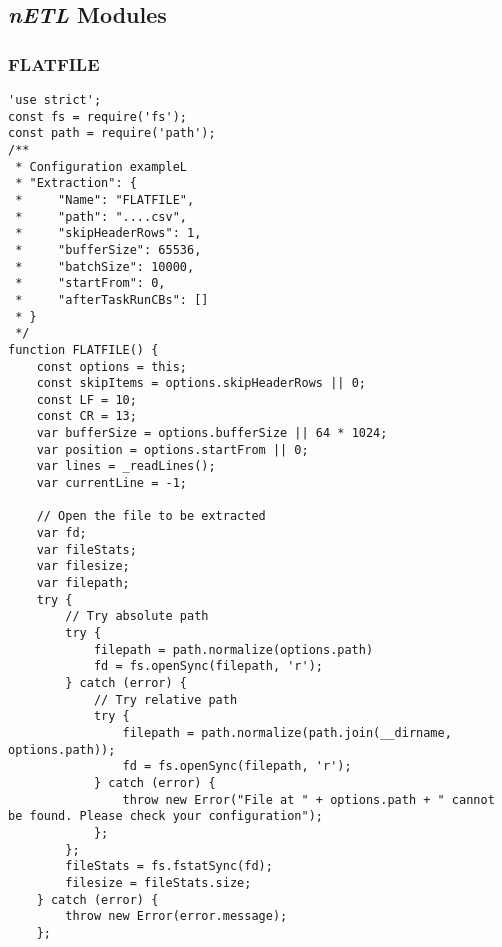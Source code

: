 \subsection{\textit{nETL} Modules}
\label{appendix:netl-modules}

\subsubsection{FLATFILE}
\label{netl-extract-flatfile}
\begin{verbatim}
'use strict';
const fs = require('fs');
const path = require('path');
/**
 * Configuration exampleL
 * "Extraction": {
 *     "Name": "FLATFILE",
 *     "path": "....csv",
 *     "skipHeaderRows": 1,
 *     "bufferSize": 65536,
 *     "batchSize": 10000,
 *     "startFrom": 0,
 *     "afterTaskRunCBs": []
 * }
 */
function FLATFILE() {
    const options = this;
    const skipItems = options.skipHeaderRows || 0;
    const LF = 10;
    const CR = 13;
    var bufferSize = options.bufferSize || 64 * 1024;
    var position = options.startFrom || 0;
    var lines = _readLines();
    var currentLine = -1;

    // Open the file to be extracted
    var fd;
    var fileStats;
    var filesize;
    var filepath;
    try {
        // Try absolute path
        try {
            filepath = path.normalize(options.path)
            fd = fs.openSync(filepath, 'r');
        } catch (error) {
            // Try relative path
            try {
                filepath = path.normalize(path.join(__dirname, options.path));
                fd = fs.openSync(filepath, 'r');
            } catch (error) {
                throw new Error("File at " + options.path + " cannot be found. Please check your configuration");
            };
        };
        fileStats = fs.fstatSync(fd);
        filesize = fileStats.size;
    } catch (error) {
        throw new Error(error.message);
    };


\end{verbatim}
